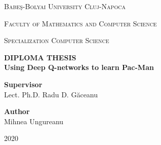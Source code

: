 \documentclass[12pt,twoside]{report}
\newcommand\blankpage{%
    \null
    \thispagestyle{empty}%
    \addtocounter{page}{-1}%
    \newpage}
\begin{document}
\begin{titlepage}
    \center %

    {\scshape\LARGE Babeş-Bolyai University Cluj-Napoca \par}
    \vspace{0.125cm}
    {\scshape\LARGE Faculty of Mathematics and Computer Science\par}
    \vspace{0.125cm}
    {\scshape\LARGE Specialization Computer Science\par}
    \vspace{5cm}

    {
        \bfseries
        \LARGE \uppercase{Diploma Thesis} \\[1.5cm]
        \huge Using Deep Q-networks to learn Pac-Man
    }\\[4cm]

    \begin{flushleft}
        \Large
            \textbf{Supervisor}
            \vspace{0.2cm}\\
        \Large
            Lect. Ph.D. Radu D. Găceanu
            \vspace{0.125cm}\\
    \end{flushleft}

    \begin{flushright}
        \Large
            \textbf{Author}
            \vspace{0.2cm}\\
        \Large
            Mihnea Ungureanu
    \end{flushright}

    \vfill

    {\center \large 2020}
\end{titlepage}

\blankpage
\end{document}
